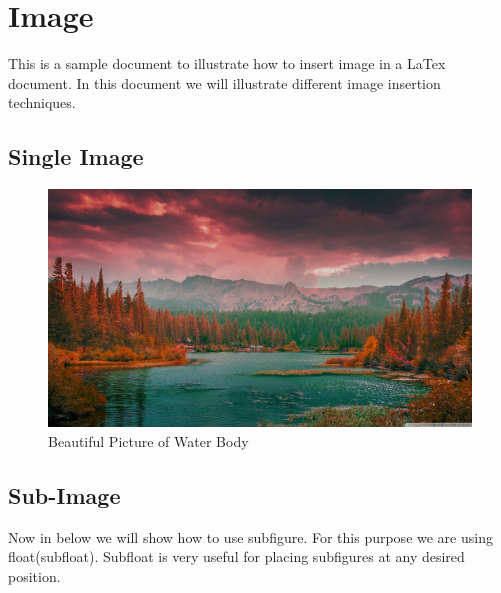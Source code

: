\documentclass[a4paper, 12pt]{article}
\begin{document}
	\tableofcontents
	\pagebreak
	\listoffigures
	\pagebreak
	\listoftables
	\pagebreak
	
	\section{Image}
	This is a sample document to illustrate how to insert image in a LaTex document. In this document we will illustrate different image insertion techniques.
	\subsection{Single Image}
	\begin{figure}[H]
		\centering
		\includegraphics[scale=0.25]{two}
		\caption{Beautiful Picture of Water Body}
		\label{two}
	\end{figure}
	
	\subsection{Sub-Image}	
	Now in below we will show how to use subfigure. For this purpose we are using float(subfloat). Subfloat is very useful for placing subfigures at any desired position.
	
\end{document}
